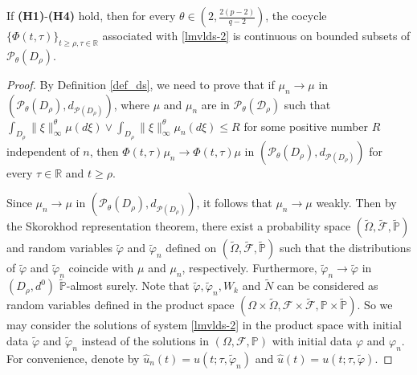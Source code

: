 \documentclass[10pt,a4paper]{amsart}
\begin{document}
\begin{theorem}\label{consys}
 If {\bf(H1)}-{\bf(H4)} hold,
then for  every 
   $ \theta \in \left(2, \tfrac{2(p-2)}{q-2} \right) $,
    the cocycle $\{ \Phi(t,\tau) \}_{t \ge { \rho}, \tau \in \mathbb{R}}$ associated with \eqref{lmvlds-2}
   is continuous on bounded subsets of $\mathcal{P}_{\theta}(D_{\rho})$.
\end{theorem}

\begin{proof}
 By Definition \ref{def_ds},
 we need to 
  prove that if $ \mu_n \to \mu $ in $
  \left( \mathcal{P}_{\theta}(D_{\rho}), d_{\mathcal{P}(D_{\rho})} \right)$,
 where $\mu$ and $\mu_n $ are 
 in
  $  \mathcal{P_{\theta}(D_{\rho})}$
 such that
   $\int_{D_{\rho}}
       \|\xi\|_{
       \infty }^{\theta} \mu(d\xi) \vee \int_{D_{\rho}} \|\xi\|_{\infty }^{\theta} \mu_n(d \xi)
       \le R$  for some
       positive number  $R  $ independent of $n$,
 then  
 $\Phi(t,\tau)\mu_n \to \Phi(t,\tau)\mu 
 $ in 
$ \left( \mathcal{P}_{\theta}(D_{\rho}), d_{\mathcal{P}(D_{\rho})} \right)$
for every $ \tau \in \mathbb{R} $ and $ t \ge \rho$.

 Since $ \mu_n \to \mu $ in
 $\left(\mathcal{P}_{\theta}(D_{\rho}), d_{\mathcal{P}(D_{\rho})} \right)$,
 it follows that $ \mu_n \to \mu $ weakly.
 Then by the Skorokhod representation theorem,
 there exist a probability space
   $(\widetilde{\Omega}, \widetilde{\mathcal{F}}, \widetilde{\mathbb{P}})$
 and random variables $\widetilde{\varphi}$ and $\widetilde{\varphi}_n$ defined on
 $(\widetilde{\Omega}, \widetilde{\mathcal{F}}, \widetilde{\mathbb{P}})$ such that the distributions of
 $\widetilde{\varphi}$ and $\widetilde{\varphi}_n$ coincide with
 $\mu$ and $\mu_n$, respectively.
 Furthermore,
   $  \widetilde{\varphi}_n 
   \to  \widetilde{\varphi}$
   in $ ({D_\rho}, d^0)$ 
   $\widetilde{\mathbb{P}}$-almost surely.
 Note that $\widetilde{\varphi}, \widetilde{\varphi}_n, W_k$
 and $\widetilde{N}$ can be considered as random variables defined in the product space
 $(\Omega \times \widetilde{\Omega},
   \mathcal{F} \times \widetilde{\mathcal{F}},
   \mathbb{P} \times \widetilde{\mathbb{P}} )
 $.
 So we may consider the solutions of system \eqref{lmvlds-2} in the product space
 with initial data $\widetilde{\varphi}$ and $\widetilde{\varphi}_n$ instead of the solutions in $(\Omega, \mathcal{F}, \mathbb{P})$
 with initial data $\varphi$ and $\varphi_n$.
 For convenience, denote by
     $\hat{u}_{n}(t) = u(t;\tau, \widetilde{\varphi}_n)$
 and $\hat{u}(t) = u(t; \tau, \widetilde{\varphi})$.


\end{proof}
\end{document}
